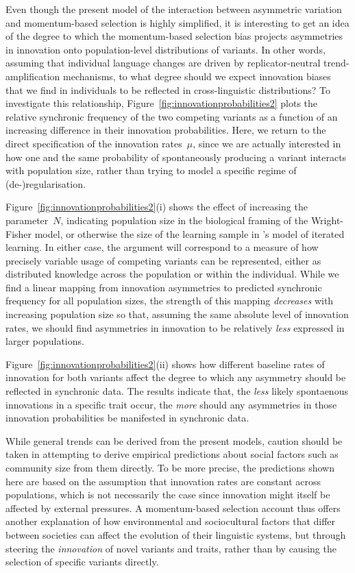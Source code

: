 Even though the present model of the interaction between asymmetric variation and momentum-based selection is highly simplified, it is interesting to get an idea of the degree to which the momentum-based selection bias projects asymmetries in innovation onto population-level distributions of variants. In other words, assuming that individual language changes are driven by replicator-neutral trend-amplification mechanisms, to what degree should we expect innovation biases that we find in individuals to be reflected in cross-linguistic distributions? To investigate this relationship, Figure~\ref{fig:innovationprobabilities2} plots the relative synchronic frequency of the two competing variants as a function of an increasing difference in their innovation probabilities. Here, we return to the direct specification of the innovation rates~$\mu$, since we are actually interested in how one and the same probability of spontaneously producing a variant interacts with population size, rather than trying to model a specific regime of (de-)regularisation.

Figure~\ref{fig:innovationprobabilities2}(i) shows the effect of increasing the parameter~$N$, indicating population size in the biological framing of the Wright-Fisher model, or otherwise the size of the learning sample in \citeauthor{Reali2009}'s model of iterated learning. In either case, the argument will correspond to a measure of how precisely variable usage of competing variants can be represented, either as distributed knowledge across the population or within the individual. While we find a linear mapping from innovation asymmetries to predicted synchronic frequency for all population sizes, the strength of this mapping \emph{decreases} with increasing population size so that, assuming the same absolute level of innovation rates, we should find asymmetries in innovation to be relatively \emph{less} expressed in larger populations. %

Figure~\ref{fig:innovationprobabilities2}(ii) shows how different baseline rates of innovation for both variants affect the degree to which any asymmetry should be reflected in synchronic data. The results indicate that, the \emph{less} likely spontaenous innovations in a specific trait occur, the \emph{more} should any asymmetries in those innovation probabilities be manifested in synchronic data.

While general trends can be derived from the present models, caution should be taken in attempting to derive empirical predictions about social factors such as community size from them directly. To be more precise, the predictions shown here are based on the assumption that innovation rates are constant across populations, which is not necessarily the case since innovation might itself be affected by external pressures. A momentum-based selection account thus offers another explanation of how environmental and sociocultural factors that differ between societies can affect the evolution of their linguistic systems, but through steering the \emph{innovation} of novel variants and traits, rather than by causing the selection of specific variants directly.

